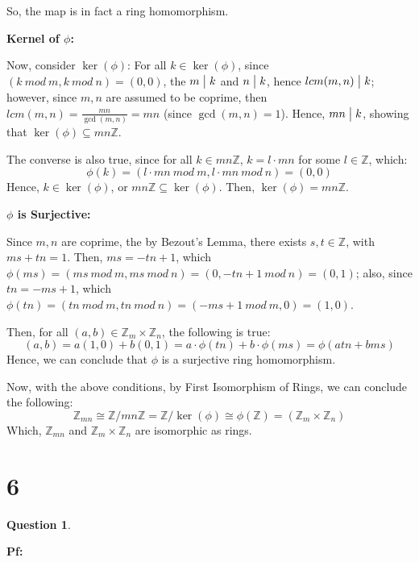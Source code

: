 \documentclass{article}
\newtheorem{question}{Question}
\begin{document}
So, the map is in fact a ring homomorphism.

\hfill

\textbf{Kernel of $\phi$:}

Now, consider $\ker(\phi)$: For all $k\in\ker(\phi)$, since $(k\ mod\ m,k\ mod\ n)=(0,0)$, the $m\bigm |k$ and $n\bigm |k$,
hence $lcm(m,n)\bigm |k$; however, since $m,n$ are assumed to be coprime, then $lcm(m,n)=\frac{mn}{\gcd(m,n)}=mn$ (since $\gcd(m,n)=1$).
Hence, $mn\bigm |k$, showing that $\ker(\phi)\subseteq mn\mathbb{Z}$.

The converse is also true, since for all $k\in mn\mathbb{Z}$, $k=l\cdot mn$ for some $l\in\mathbb{Z}$, which:
$$\phi(k)=(l\cdot mn\ mod\ m,l\cdot mn\ mod\ n) = (0,0)$$
Hence, $k\in\ker(\phi)$, or $mn\mathbb{Z}\subseteq \ker(\phi)$. Then, $\ker(\phi)=mn\mathbb{Z}$.

\hfill

\textbf{$\phi$ is Surjective:}

Since $m,n$ are coprime, the by Bezout's Lemma, there exists $s,t\in\mathbb{Z}$, with $ms+tn=1$.
Then, $ms=-tn+1$, which $\phi(ms)=(ms\ mod\ m,ms\ mod\ n)=(0, -tn+1\ mod\ n)=(0,1)$;
also, since $tn=-ms+1$, which $\phi(tn)=(tn\ mod\ m, tn\ mod\ n)=(-ms+1\ mod\ m, 0)=(1,0)$.

Then, for all $(a,b)\in \mathbb{Z}_m\times\mathbb{Z}_n$, the following is true:
$$(a,b)=a(1,0)+b(0,1)=a\cdot\phi(tn)+b\cdot\phi(ms) = \phi(atn+bms)$$
Hence, we can conclude that $\phi$ is a surjective ring homomorphism.

\hfill

Now, with the above conditions, by First Isomorphism of Rings, we can conclude the following:
$$\mathbb{Z}_{mn}\cong \mathbb{Z}/mn\mathbb{Z}=\mathbb{Z}/\ker(\phi)\cong \phi(\mathbb{Z})=(\mathbb{Z}_m\times\mathbb{Z}_n)$$
Which, $\mathbb{Z}_{mn}$ and $\mathbb{Z}_m\times\mathbb{Z}_n$ are isomorphic as rings.

\break

\section*{6}
\begin{myBox}[]{}
    \begin{question}
        
    \end{question}
\end{myBox}

\textbf{Pf:}
\end{document}
